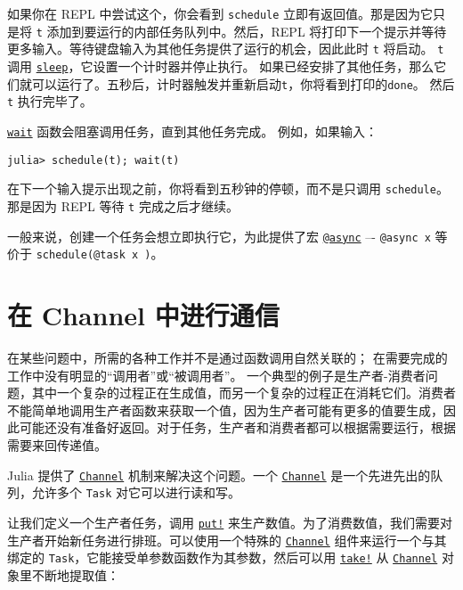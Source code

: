 如果你在 REPL 中尝试这个，你会看到 \texttt{schedule} 立即有返回值。那是因为它只是将 \texttt{t} 添加到要运行的内部任务队列中。然后，REPL 将打印下一个提示并等待更多输入。等待键盘输入为其他任务提供了运行的机会，因此此时 \texttt{t} 将启动。 \texttt{t} 调用 \hyperlink{3231475347583891391}{\texttt{sleep}}，它设置一个计时器并停止执行。 如果已经安排了其他任务，那么它们就可以运行了。五秒后，计时器触发并重新启动\texttt{t}，你将看到打印的\texttt{done}。 然后\texttt{t} 执行完毕了。



\hyperlink{13761789780433862250}{\texttt{wait}} 函数会阻塞调用任务，直到其他任务完成。 例如，如果输入：




\begin{verbatim}
julia> schedule(t); wait(t)
\end{verbatim}



在下一个输入提示出现之前，你将看到五秒钟的停顿，而不是只调用 \texttt{schedule}。 那是因为 REPL 等待 \texttt{t} 完成之后才继续。



一般来说，创建一个任务会想立即执行它，为此提供了宏 \hyperlink{10770947021537241619}{\texttt{@async}} –- \texttt{@async x} 等价于 \texttt{schedule(@task x )}。



\hypertarget{2837362571325865994}{}


\section{在 Channel 中进行通信}



在某些问题中，所需的各种工作并不是通过函数调用自然关联的； 在需要完成的工作中没有明显的“调用者”或“被调用者”。 一个典型的例子是生产者-消费者问题，其中一个复杂的过程正在生成值，而另一个复杂的过程正在消耗它们。消费者不能简单地调用生产者函数来获取一个值，因为生产者可能有更多的值要生成，因此可能还没有准备好返回。对于任务，生产者和消费者都可以根据需要运行，根据需要来回传递值。



Julia 提供了 \hyperlink{12548845729684045604}{\texttt{Channel}} 机制来解决这个问题。一个 \hyperlink{12548845729684045604}{\texttt{Channel}} 是一个先进先出的队列，允许多个 \texttt{Task} 对它可以进行读和写。



让我们定义一个生产者任务，调用 \hyperlink{10812715779190652189}{\texttt{put!}} 来生产数值。为了消费数值，我们需要对生产者开始新任务进行排班。可以使用一个特殊的 \hyperlink{12548845729684045604}{\texttt{Channel}} 组件来运行一个与其绑定的 \texttt{Task}，它能接受单参数函数作为其参数，然后可以用 \hyperlink{4963355246106153560}{\texttt{take!}} 从 \hyperlink{12548845729684045604}{\texttt{Channel}} 对象里不断地提取值：




